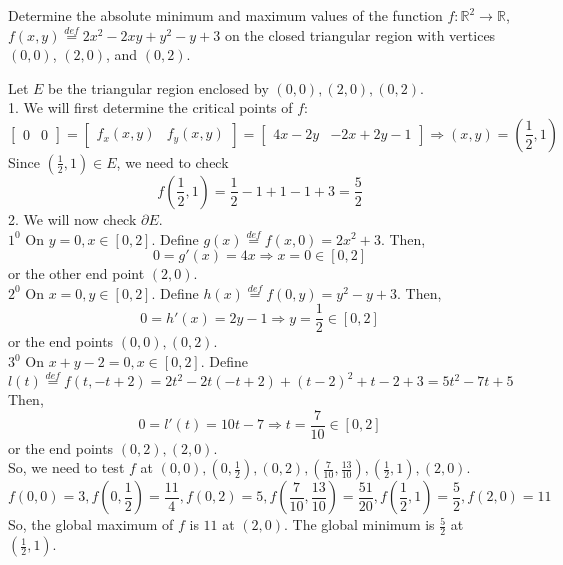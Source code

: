\documentclass[11pt,letterpaper,cm]{nupset}
\newcommand{\bmat}[1]{\begin{bmatrix} #1 \end{bmatrix}}
\begin{document}
\begin{problem}[Exercise 2] Determine the absolute minimum and maximum values of the function $f:\mathbb{R}^2\to\mathbb{R}$, $f(x,y)\stackrel{def}{=}2x^2-2xy+y^2-y+3$ on the closed triangular region with vertices $(0,0)$, $(2,0)$, and $(0,2)$.
\end{problem}
\begin{solution}
	Let $E$ be the triangular region enclosed by $(0,0),(2,0),(0,2)$.\\
	1. We will first determine the critical points of $f$:
	$$\bmat{0 & 0}=\bmat{f_x(x,y) & f_y(x,y)}=\bmat{4x-2y & -2x+2y-1}\Rightarrow (x,y)=(\frac{1}{2},1)$$
	Since $(\frac{1}{2},1)\in E$, we need to check 
	$$f(\frac{1}{2},1)=\frac{1}{2}-1+1-1+3=\frac{5}{2}$$
	2. We will now check $\partial E$.\\
		\hspace*{5mm} $1^0$ On $y=0,x\in [0,2]$. Define $g(x)\stackrel{def}{=} f(x,0)=2x^2+3$. Then, 
		$$0=g'(x)=4x\Rightarrow x=0\in [0,2]$$ 
		or the other end point $(2,0)$.\\
		\hspace*{5mm} $2^0$ On $x=0,y\in [0,2]$. Define $h(x)\stackrel{def}{=} f(0,y)=y^2-y+3$. Then, $$0=h'(x)=2y-1\Rightarrow y=\frac{1}{2}\in [0,2]$$
		or the end points $(0,0),(0,2)$.\\
		\hspace*{5mm} $3^0$ On $x+y-2=0,x\in [0,2]$. Define 
		$$l(t)\stackrel{def}{=} f(t,-t+2)=2t^2-2t(-t+2)+(t-2)^2+t-2+3=5t^2-7t+5$$ Then, 
		$$0=l'(t)=10t-7\Rightarrow t=\frac{7}{10}\in [0,2]$$ 
		or the end points $(0,2),(2,0)$.\\
	
	So, we need to test $f$ at $(0,0),(0,\frac{1}{2}),(0,2),(\frac{7}{10},\frac{13}{10}),(\frac{1}{2},1),(2,0)$.\\
	$$f(0,0)=3,f(0,\frac{1}{2})=\frac{11}{4},f(0,2)=5,f(\frac{7}{10},\frac{13}{10})=\frac{51}{20},f(\frac{1}{2},1)=\frac{5}{2},f(2,0)=11$$
	So, the global maximum of $f$ is $11$ at $(2,0)$. The global minimum is $\frac{5}{2}$ at $(\frac{1}{2},1)$.


\end{solution}
\newpage
\end{document}
